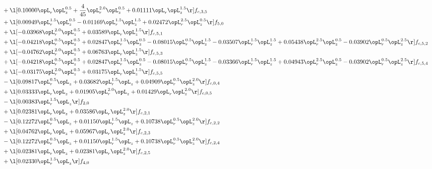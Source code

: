 \begin{alignat}{2}
& + \l[  0.10000 \opL_r \opL_z^{0.5} + \frac{4}{45} \opL_r^{2.0} \opL_z^{0.5} +  0.01111 \opL_r \opL_z^{1.5}  \r] f_{c,3,5} \nonumber \\ 
& + \l[  0.00949 \opL_r^{1.5} \opL_z^{0.5}   -0.01169 \opL_r^{1.5} \opL_z^{1.5} +  0.02472 \opL_r^{2.5} \opL_z^{0.5}  \r] f_{5,0} \nonumber \\ 
& + \l[  -0.03968 \opL_r^{2.0} \opL_z^{0.5} +  0.03589 \opL_r \opL_z^{1.5}  \r] f_{c,5,1} \nonumber \\ 
& + \l[  -0.04218 \opL_r^{0.5} \opL_z^{0.5} +  0.02847 \opL_r^{1.5} \opL_z^{0.5}   -0.08015 \opL_r^{0.5} \opL_z^{1.5}   -0.03507 \opL_r^{1.5} \opL_z^{1.5} +  0.05438 \opL_r^{2.5} \opL_z^{0.5}   -0.03902 \opL_r^{0.5} \opL_z^{2.5}  \r] f_{c,5,2} \nonumber \\ 
& + \l[  -0.04762 \opL_r^{2.0} \opL_z^{0.5} +  0.06763 \opL_r \opL_z^{1.5}  \r] f_{c,5,3} \nonumber \\ 
& + \l[  -0.04218 \opL_r^{0.5} \opL_z^{0.5} +  0.02847 \opL_r^{1.5} \opL_z^{0.5}   -0.08015 \opL_r^{0.5} \opL_z^{1.5}   -0.03366 \opL_r^{1.5} \opL_z^{1.5} +  0.04943 \opL_r^{2.5} \opL_z^{0.5}   -0.03902 \opL_r^{0.5} \opL_z^{2.5}  \r] f_{c,5,4} \nonumber \\ 
& + \l[  -0.03175 \opL_r^{2.0} \opL_z^{0.5} +  0.03175 \opL_r \opL_z^{1.5}  \r] f_{c,5,5} \nonumber \\ 
& - \l[  0.09817 \opL_r^{0.5} \opL_z +  0.03682 \opL_r^{1.5} \opL_z +  0.04909 \opL_r^{0.5} \opL_z^{2.0}  \r] f_{c,0,4} \nonumber \\ 
& + \l[  0.03333 \opL_r \opL_z +  0.01905 \opL_r^{2.0} \opL_z +  0.01429 \opL_r \opL_z^{2.0}  \r] f_{c,0,5} \nonumber \\ 
& - \l[  0.00383 \opL_r^{1.5} \opL_z  \r] f_{2,0} \nonumber \\ 
& + \l[  0.02381 \opL_r \opL_z +  0.03586 \opL_r \opL_z^{2.0}  \r] f_{c,2,1} \nonumber \\ 
& - \l[  0.12272 \opL_r^{0.5} \opL_z +  0.01150 \opL_r^{1.5} \opL_z +  0.10738 \opL_r^{0.5} \opL_z^{2.0}  \r] f_{c,2,2} \nonumber \\ 
& + \l[  0.04762 \opL_r \opL_z +  0.05967 \opL_r \opL_z^{2.0}  \r] f_{c,2,3} \nonumber \\ 
& - \l[  0.12272 \opL_r^{0.5} \opL_z +  0.01150 \opL_r^{1.5} \opL_z +  0.10738 \opL_r^{0.5} \opL_z^{2.0}  \r] f_{c,2,4} \nonumber \\ 
& + \l[  0.02381 \opL_r \opL_z +  0.02381 \opL_r \opL_z^{2.0}  \r] f_{c,2,5} \nonumber \\ 
& + \l[  0.02330 \opL_r^{1.5} \opL_z  \r] f_{4,0} \nonumber \\ 

\end{alignat}
